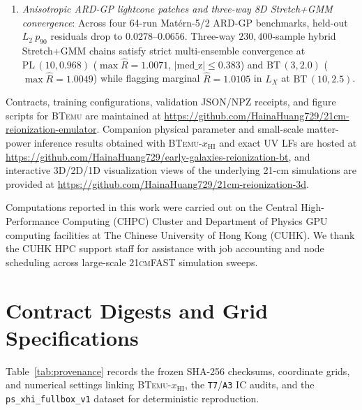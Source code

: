 \documentclass[aps,prd,reprint,superscriptaddress,nofootinbib,amsmath,amssymb,floatfix,longbibliography]{revtex4-2}
\begin{document}
\begin{enumerate}
\item \emph{Anisotropic ARD-GP lightcone patches and three-way 8D Stretch+GMM convergence}: Across four 64-run Mat\'ern-5/2 ARD-GP benchmarks, held-out $L_2\ p_{90}$ residuals drop to $0.0278\text{--}0.0656$. Three-way $230{,}400$-sample hybrid Stretch+GMM chains satisfy strict multi-ensemble convergence at $\mathrm{PL}\,(10,0.968)$ ($\max\widehat{R}=1.0071$, $|\mathrm{med\_z}|\le 0.383$) and $\mathrm{BT}\,(3,2.0)$ ($\max\widehat{R}=1.0049$) while flagging marginal $\widehat{R}=1.0105$ in $L_X$ at $\mathrm{BT}\,(10,2.5)$.
\end{enumerate}

Contracts, training configurations, validation JSON/NPZ receipts, and figure scripts for \textsc{BTemu} are maintained at \url{https://github.com/HainaHuang729/21cm-reionization-emulator}. Companion physical parameter and small-scale matter-power inference results obtained with \textsc{BTemu}-$x_{\mathrm{HI}}$ and exact UV LFs are hosted at \url{https://github.com/HainaHuang729/early-galaxies-reionization-bt}, and interactive 3D/2D/1D visualization views of the underlying 21-cm simulations are provided at \url{https://github.com/HainaHuang729/21cm-reionization-3d}.

\begin{acknowledgments}
Computations reported in this work were carried out on the Central High-Performance Computing (CHPC) Cluster and Department of Physics GPU computing facilities at The Chinese University of Hong Kong (CUHK). We thank the CUHK HPC support staff for assistance with job accounting and node scheduling across large-scale \textsc{21cmFAST} simulation sweeps.
\end{acknowledgments}

\appendix

\section{Contract Digests and Grid Specifications}\label{app:provenance}

Table~\ref{tab:provenance} records the frozen SHA-256 checksums, coordinate grids, and numerical settings linking \textsc{BTemu}-$x_{\mathrm{HI}}$, the \texttt{T7}/\texttt{A3} IC audits, and the \texttt{ps\_xhi\_fullbox\_v1} dataset for deterministic reproduction.
\end{document}
